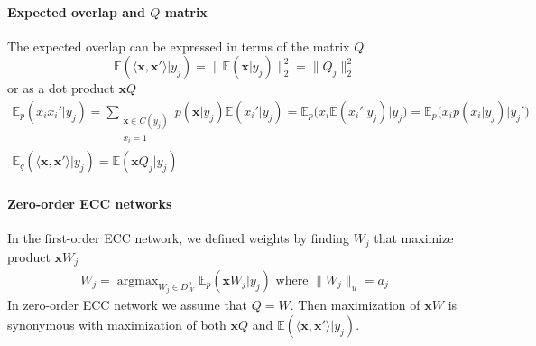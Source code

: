 \documentclass[12pt]{article}
\DeclareMathOperator*{\argmax}{argmax}
\begin{document}
\paragraph{Expected overlap and $Q$ matrix} 
The expected overlap can be expressed in terms of the matrix $Q$
\[
\mathbb{E}(\langle \boldsymbol{x}, \boldsymbol{x}'\rangle|y_j) = \lVert \mathbb{E}(\boldsymbol{x}|y_j) \rVert_2^2 =  \lVert Q_j \rVert_2^2
\]
or as a dot product $\boldsymbol{x}Q$
\begin{gather*}
	\mathbb{E}_p(x_i x_i' | y_j) = 
	\sum_{\substack{\boldsymbol{x}\in C(y_j) \\ x_i=1}} p(\boldsymbol{x}|y_j) \mathbb{E}(x_i'|y_j)= \mathbb{E}_p\big(x_i \mathbb{E}(x_i'|y_j) \big| y_j\big) = \mathbb{E}_p\big(x_i p(x_i|y_j) \big| y_j'\big)\\
	\mathbb{E}_q(\langle \boldsymbol{x}, \boldsymbol{x}'\rangle|y_j) = \mathbb{E}(\boldsymbol{x} Q_j | y_j)
\end{gather*}

\paragraph{Zero-order ECC networks}
In the first-order ECC network, we defined weights by finding $W_j$ that maximize product $\boldsymbol{x}W_j$
\begin{gather*}
	W_j = \argmax_{W_j\in D_W^{n}} \mathbb{E}_p(\boldsymbol{x}W_j|y_j)\text{ where } \lVert W_j \rVert_u=a_j
\end{gather*}
In zero-order ECC network we assume that $Q=W$. Then maximization of $\boldsymbol{x}W$ is synonymous with maximization of both $\boldsymbol{x}Q$ and $\mathbb{E}(\langle \boldsymbol{x}, \boldsymbol{x}'\rangle|y_j) $. 

\end{document}
